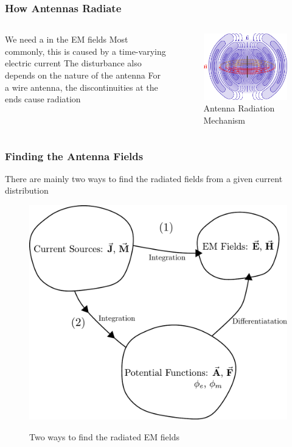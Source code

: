 \documentclass[10pt, compress]{beamer}
\begin{document}
\begin{frame}
  \frametitle{How Antennas Radiate}
    \begin{columns}[T] %
  \begin{column}{.4\textwidth}
\begin{outline}
  \1 We need a \color{red}{disturbance} in the EM fields
  \2 Most commonly, this is caused by a time-varying electric current
  \1 The disturbance also depends on the nature of the antenna
  \2 For a wire antenna, the discontinuities at the ends cause radiation
\end{outline}
   \end{column}
 \begin{column}[T]{.6\textwidth}
    \begin{figure}
      \centering
          \includegraphics[width=.9\textwidth]{radiation.pdf}
      \caption{Antenna Radiation Mechanism}
    \end{figure}
      \end{column}%
\end{columns}
\end{frame}

\begin{frame}[fragile]
  \frametitle{Finding the Antenna Fields}
\begin{outline}
  \1 There are mainly two ways to find the radiated fields from a given current distribution
\end{outline}
\begin{figure}
  \centering
          {\includegraphics[width=.6\linewidth]{calculation.pdf}
        \label{fig:aug_fields}}
        \caption{Two ways to find the radiated EM fields}
\end{figure}
\end{frame}
\end{document}
